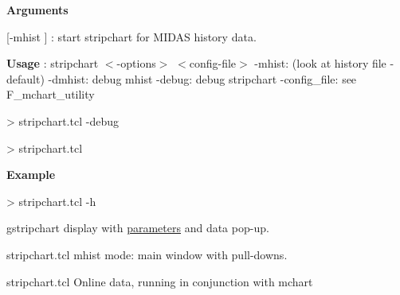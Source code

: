 \begin{DoxyItemize}
\item {\bfseries  Arguments }
\begin{DoxyItemize}
\item \mbox{[}-\/mhist \mbox{]} : start stripchart for MIDAS history data.
\end{DoxyItemize}
\item {\bfseries  Usage }: stripchart $<$-\/options$>$ $<$config-\/file$>$ -\/mhist: (look at history file -\/default) -\/dmhist: debug mhist -\/debug: debug stripchart -\/config\_\-file: see F\_\-mchart\_\-utility 
\begin{DoxyCode}
 > stripchart.tcl -debug

 > stripchart.tcl
\end{DoxyCode}

\item {\bfseries  Example } 
\begin{DoxyCode}
 > stripchart.tcl -h
\end{DoxyCode}

\end{DoxyItemize}

\begin{center}  gstripchart display with \hyperlink{structparameters}{parameters} and data pop-\/up.  \end{center} 

\begin{center}  stripchart.tcl mhist mode: main window with pull-\/downs.  \end{center} 

\begin{center}  stripchart.tcl Online data, running in conjunction with mchart  \end{center} 



\par
 \label{index_end}
\hypertarget{index_end}{}
 